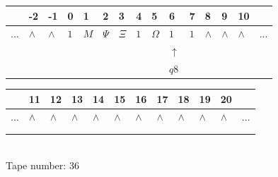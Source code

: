 \documentclass[11pt]{article}
\begin{document}
\begin{table}[H]
\centering
\begin{tabular}{lllllllllllllll}
 & -2 & -1 & 0 & 1 & 2 & 3 & 4 & 5 & 6 & 7 & 8 & 9 & 10 & \\
\hline
$...$ & \multicolumn{1}{|l|}{$\wedge$} & \multicolumn{1}{|l|}{$\wedge$} & \multicolumn{1}{|l|}{$1$} & \multicolumn{1}{|l|}{$M$} & \multicolumn{1}{|l|}{$\Psi$} & \multicolumn{1}{|l|}{$\Xi$} & \multicolumn{1}{|l|}{$1$} & \multicolumn{1}{|l|}{$\Omega$} & \multicolumn{1}{|l|}{$1$} & \multicolumn{1}{|l|}{$1$} & \multicolumn{1}{|l|}{$\wedge$} & \multicolumn{1}{|l|}{$\wedge$} & \multicolumn{1}{|l|}{$\wedge$} & $...$\\
\hline
&  &  &  &  &  &  &  &  & $\uparrow$ &  &  &  &  &  \\
&  &  &  &  &  &  &  &  & $ q8 $ &  &  &  &  &  \\
\end{tabular}
\begin{tabular}{llllllllllll}
 & 11 & 12 & 13 & 14 & 15 & 16 & 17 & 18 & 19 & 20 & \\
\hline
$...$ & \multicolumn{1}{|l|}{$\wedge$} & \multicolumn{1}{|l|}{$\wedge$} & \multicolumn{1}{|l|}{$\wedge$} & \multicolumn{1}{|l|}{$\wedge$} & \multicolumn{1}{|l|}{$\wedge$} & \multicolumn{1}{|l|}{$\wedge$} & \multicolumn{1}{|l|}{$\wedge$} & \multicolumn{1}{|l|}{$\wedge$} & \multicolumn{1}{|l|}{$\wedge$} & \multicolumn{1}{|l|}{$\wedge$} & $...$\\
\hline
&  &  &  &  &  &  &  &  &  &  &  \\
&  &  &  &  &  &  &  &  &  &  &  \\
\end{tabular}
\\
Tape number: 36
\noindent\makebox[\linewidth]{\hdashrule{\textwidth}{1pt}{1pt}}\end{table}
\end{document}
